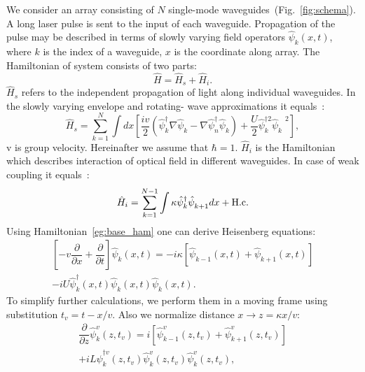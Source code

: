 \documentclass{osa-article}
\begin{document}
\par
We consider an array consisting of $N$ single-mode waveguides~(Fig.~\ref{fig:schema}). 
A long laser pulse is sent to the input of each waveguide. Propagation of the pulse may be described in terms of slowly varying field operators $\hat{\psi}_{k}\left(x,t\right)$, where $k$ is the index of a waveguide, $x$ is the coordinate along array. The Hamiltonian of system consists of two parts:
\begin{equation}\label{eg:base_ham}
	\hat{H}=\hat{H}_s + \hat{H}_i.
\end{equation}
$\hat{H}_s$ refers to the independent propagation of light along individual waveguides.
In the slowly varying envelope and rotating-
wave approximations it equals~\cite{drummond_quantum_2014}: 
\begin{equation}
	\hat{H}_s = \sum^{N}_{k=1}\int dx\left[\dfrac{iv}{2}\left(\hat{\psi}^{\dag}_k\nabla\hat{\psi}^{\phantom{\dag}}_k - \nabla\hat{\psi}^{\dag}_n\hat{\psi}^{\phantom{\dag}}_k\right) +\dfrac{U}{2}\hat{\psi}^{\dag2}_k\hat{\psi}^{\phantom{\dag}2}_k\right], 
\end{equation}
v is group velocity. Hereinafter we assume that $\hbar=1$. $\hat{H}_i$ is the Hamiltonian which describes interaction of optical field in different waveguides. In case of weak coupling it equals~\cite{agarwal_quantum_2012}:
\begin{equation}
	\hat{H}_i = \sum^{N-1}_{k=1}\int \kappa\hat{\psi}^{\dag}_k\hat{\psi}^{\phantom{\dag}}_{k+1} dx +\rm{H.c.}
\end{equation}
Using Hamiltonian~\eqref{eg:base_ham} one can derive Heisenberg equations:
\begin{equation}
	\begin{array}{r}
		\left[-v\dfrac{\partial}{\partial x} + \dfrac{\partial}{\partial t}\right]\hat{\psi}^{\phantom{\dag}}_k\!\left(x,\!t\!\right) = -i\kappa\left[\hat{\psi}^{\phantom{\dag}}_{k-1}\!\left(x,\!t\!\right) + \hat{\psi}^{\phantom{\dag}}_{k+1}\!\left(x,\!t\!\right)\right] \\ -iU\hat{\psi}^{\dag}_k\!\left(x,\!t\!\right)\hat{\psi}^{\phantom{\dag}}_{k}\!\left(x,\!t\!\right)\hat{\psi}^{\phantom{\dag}}_{k}\!\left(x,\!t\!\right).
	\end{array}
\end{equation}
To simplify further calculations, we perform them in a moving frame using substitution $t_v = t - x/v$. Also we normalize distance $x \rightarrow z = \kappa x / v$:
\begin{equation}\label{eq:heis}
	\begin{array}{r}
		\dfrac{\partial}{\partial z}\hat{\psi}^{v}_k\!\left(z,\!t_v\!\right) = i\left[\hat{\psi}^{v}_{k-1}\!\left(z,\!t_v\!\right) + \hat{\psi}^{v}_{k+1}\!\left(z,\!t_v\!\right)\right] \\ +iL\hat{\psi}^{\dag v}_k\!\left(z,\!t_v\!\right)\hat{\psi}^{v}_{k}\!\left(z,\!t_v\!\right)\hat{\psi}^{v}_{k}\!\left(z,\!t_v\!\right),
	\end{array}
\end{equation}
\end{document}
